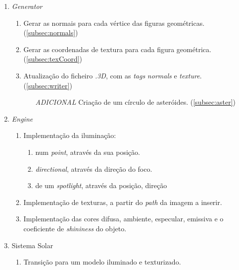 \documentclass[runningheads]{llncs}
\begin{document}
    \begin{enumerate}
        \item \textit{Generator}
        \begin{enumerate}
            \item Gerar as normais para cada vértice das figuras geométricas. (\ref{subsec:normals})
            \item Gerar as coordenadas de textura para cada figura geométrica. (\ref{subsec:texCoord})
            \item Atualização do ficheiro \textit{.3D}, com as \textit{tags} 
                  \textit{normals} e \textit{texture}.(\ref{subsec:writer})
            \begin{enumerate}
                \item[\textit{ADICIONAL}]{Criação de um círculo de asteróides.} (\ref{subsec:aster})
            \end{enumerate}
        \end{enumerate}
        \item \textit{Engine}
        \begin{enumerate}
            \item Implementação da iluminação:
            \begin{enumerate}
                \item num \textit{point}, através da sua posição.
                \item \textit{directional}, através da direção do foco.
                \item de um \textit{spotlight}, através da posição, direção 
            \end{enumerate}
            \item Implementação de texturas, a partir do \textit{path} da imagem a inserir.
            \item Implementação das cores difusa, ambiente, especular, emissiva e o coeficiente
                  de \textit{shininess} do objeto.
        \end{enumerate}
        \item Sistema Solar 
        \begin{enumerate}
            \item Transição para um modelo iluminado e texturizado.
        \end{enumerate}
    \end{enumerate}
    
    
    
    
    

    
\end{document}
